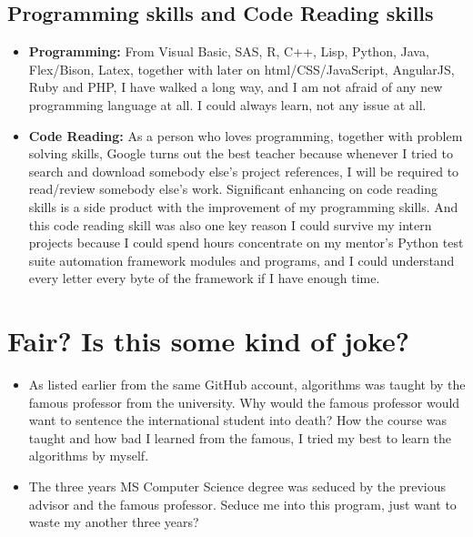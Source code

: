 \documentclass[9pt,b5paper]{article}
\begin{document}
\subsection{Programming skills and Code Reading skills}
\label{sec-9-3}
\begin{itemize}
\item \textbf{Programming:} From Visual Basic, SAS, R, C++, Lisp, Python, Java, Flex/Bison, Latex, together with later on html/CSS/JavaScript, AngularJS, Ruby and PHP, I have walked a long way, and I am not afraid of any new programming language at all. I could always learn, not any issue at all.
\item \textbf{Code Reading:} As a person who loves programming, together with problem solving skills, Google turns out the best teacher because whenever I tried to search and download somebody else's project references, I will be required to read/review somebody else's work. Significant enhancing on code reading skills is a side product with the improvement of my programming skills. And this code reading skill was also one key reason I could survive my intern projects because I could spend hours concentrate on my mentor's Python test suite automation framework modules and programs, and I could understand every letter every byte of the framework if I have enough time.
\end{itemize}

\section{Fair? Is this some kind of joke?}
\label{sec-10}
\begin{itemize}
\item As listed earlier from the same GitHub account, algorithms was taught by the famous professor from the university. Why would the famous professor would want to sentence the international student into death? How the course was taught and how bad I learned from the famous, I tried my best to learn the algorithms by myself.
\item The three years MS Computer Science degree was seduced by the previous advisor and the famous professor. Seduce me into this program, just want to waste my another three years?
\end{itemize}
\end{document}
